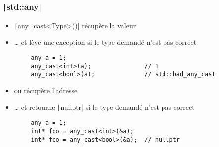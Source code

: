 \documentclass[C++.tex]{subfiles}
\begin{document}
\begin{frame}[fragile]
	\frametitle{\texttt|std::any|}
	\begin{itemize}
		\item \texttt|any_cast<Type>()| récupère la valeur
		\item \ldots{} et lève une exception si le type demandé n'est pas correct
	\end{itemize}

	\begin{verbatim}
		any a = 1;
		any_cast<int>(a);               // 1
		any_cast<bool>(a);              // std::bad_any_cast
	\end{verbatim}

	\begin{itemize}
		\item ou récupère l'adresse
		\item \ldots{} et retourne \texttt|nullptr| si le type demandé n'est pas correct
	\end{itemize}

	\begin{verbatim}
		any a = 1;
		int* foo = any_cast<int>(&a);
		int* foo = any_cast<bool>(&a);  // nullptr
	\end{verbatim}



\end{frame}
\end{document}
